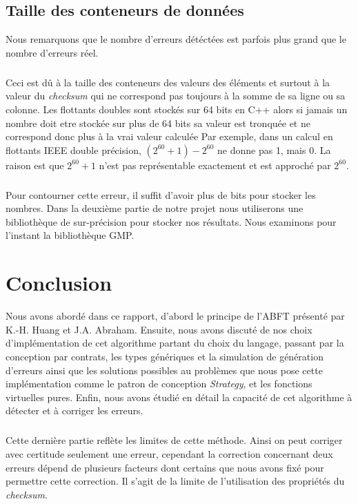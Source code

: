 \documentclass[a4paper, 10pt]{report}
\begin{document}
\section{Taille des conteneurs de données}
Nous remarquons que le nombre d'erreurs détéctées est parfois plus grand que le nombre d'erreurs réel.
\paragraph*{}
Ceci est dû à la taille des conteneurs des valeurs des éléments et surtout à la valeur du \textit{checksum} qui ne
correspond pas toujours à la somme de sa ligne ou sa colonne. Les flottants doubles sont stockés sur 64 bits en C++ alors
si jamais un nombre doit etre stockée sur plus de 64 bits sa valeur est tronquée et ne correspond donc plus à la vrai
valeur calculée\newline
Par exemple, dans un calcul en flottants IEEE double précision, $(2^{60}+1)-2^{60}$  ne donne pas 1, mais 0. La raison est que 
$2^{60}+1$ n'est pas représentable exactement et est approché par $2^{60}$.
\paragraph*{}
Pour contourner cette erreur, il suffit d'avoir plus de bits pour stocker les nombres. Dans la deuxième partie de notre
projet nous utiliserons une bibliothèque de sur-précision pour stocker nos résultats. Nous examinons pour l'instant
la bibliothèque GMP.

\chapter*{Conclusion}
Nous avons abordé dans ce rapport, d'abord le principe de l'ABFT présenté par K.-H. Huang et J.A. Abraham. Ensuite, nous avons
discuté de nos choix d'implémentation de cet algorithme partant du choix du langage, passant par la conception par contrats,
les types génériques et la simulation de génération d'erreurs ainsi que les solutions possibles au problèmes que nous pose cette
implémentation comme le patron de conception \textit{Strategy}, et les fonctions virtuelles pures. Enfin, nous avons étudié en 
détail la capacité de cet algorithme à détecter et à corriger les erreurs.
\paragraph*{}
Cette dernière partie reflète les limites de cette méthode. Ainsi on peut corriger avec certitude seulement une erreur,
cependant la correction concernant deux erreurs dépend de plusieurs facteurs dont certains que nous avons fixé pour permettre
cette correction. Il s'agit de la limite de l'utilisation des propriétés du \textit{checksum}.
\end{document}
